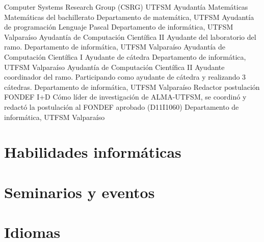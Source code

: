\documentclass[11pt,a4paper]{moderncv}
\begin{document}
	{Computer Systems Research Group (CSRG)}
	{UTFSM}
	{}
	{Ayudantía Matemáticas}
	{Matemáticas del bachillerato}
	{Departamento de matemática, UTFSM}
	{}{}
	{Ayudantía de programación}
	{Lenguaje Pascal}
	{Departamento de informática, UTFSM}
	{Valparaíso}
	{}
	{Ayudantía de Computación Científica II}
	{Ayudante del laboratorio del ramo.}
	{Departamento de informática, UTFSM}
	{Valparaíso}
	{}
	{Ayudantía de Computación Científica I}
	{Ayudante de cátedra}
	{Departamento de informática, UTFSM}
	{Valparaíso}
	{}
	{Ayudantía de Computación Científica II}
	{Ayudante coordinador del ramo. Participando como ayudante de cátedra y realizando 3 cátedras.}
	{Departamento de informática, UTFSM}
	{Valparaíso}
	{}
	{Redactor postulación FONDEF I+D}
	{Cómo líder de investigación de ALMA-UTFSM, se coordinó y redactó la postulación al FONDEF aprobado (D11I1060)}
	{Departamento de informática, UTFSM}
	{Valparaíso}
	{}

\section{Habilidades informáticas}

\section{Seminarios y eventos}

\section{Idiomas}
\end{document}

